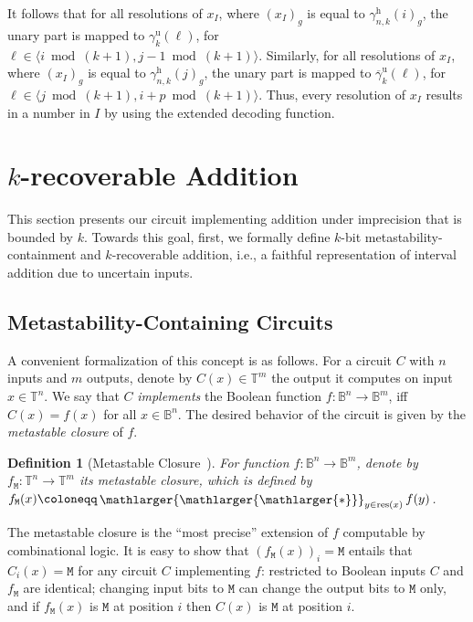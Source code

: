 \documentclass[9pt,journal,compsoc]{IEEEtran}
\newtheorem{definition}[theorem]{Definition}
\theoremstyle{remark}
\DeclareMathOperator{\res}{res}
\newcommand{\bigstarr}{\mathop{\raisebox{-.7pt}{\ensuremath{\mathlarger{\mathlarger{\mathlarger{*}}}}}}}
\newcommand{\mfu}{\mathtt{M}}
\newcommand{\IB}{\mathbb{B}}
\newcommand{\IT}{\mathbb{T}}
\newcommand{\ang}[1]{\langle{#1}\rangle}
\newcommand{\intvl}[1]{\ang{#1}}
\newcommand{\gUnary}[1]{\gamma_{#1}^{\operatorname{u}}}
\newcommand{\gbUnary}[1]{\overline{\gamma}_{#1}^{\operatorname{u}}}
\newcommand{\gHyb}[1]{\gamma_{#1}^{\operatorname{h}}}
\begin{document}
\begin{IEEEproof}
  It follows that for all resolutions of $x_I$, where $(x_I)_g$ is equal to
    $\gHyb{n,k}(i)_g$, the unary part is mapped to
    $\gUnary{k}(\ell)$, for $\ell\in\intvl{i \bmod (k+1), j-1 \bmod (k+1)}$.
  Similarly, for all resolutions of $x_I$, where $(x_I)_g$ is equal to
    $\gHyb{n,k}(j)_g$, the unary part is mapped to
    $\gbUnary{k}(\ell)$, for $\ell\in\intvl{j \bmod (k+1), i+p \bmod (k+1)}$.
  Thus, every resolution of $x_I$ results in a number in $I$ by using the extended
    decoding function.
\end{IEEEproof}

\section{\texorpdfstring{$k$}{k}-recoverable Addition}\label{sec:addition}

This section presents our circuit implementing addition under imprecision
  that is bounded by $k$.
Towards this goal, first, we formally define $k$-bit metastability-containment 
  and $k$-recoverable addition, i.e.,
  a faithful representation of interval addition due to uncertain inputs.

\subsection{Metastability-Containing Circuits}\label{sec:hazfree}

A convenient formalization of this concept is as follows. For a circuit $C$
with $n$ inputs and $m$ outputs, denote by $C(x)\in \IT^m$ the output it
computes on input $x\in \IT^n$. We say that $C$ \emph{implements} the Boolean
function $f\colon \IB^n\to \IB^m$, iff $C(x)=f(x)$ for all $x\in \IB^n$. The
desired behavior of the circuit is given by the \emph{metastable closure} of
$f$.

\begin{definition}[Metastable Closure~\cite{friedrichs18containing}]\label{def:hfree}
For function $f\colon \IB^n\to \IB^m$, denote by $f_{\mfu}\colon \IT^n\to \IT^m$
its \emph{metastable closure}, which is defined by $f_{\mfu}(x)\coloneqq
\bigstarr_{y\in \res(x)}f(y)$.
\end{definition}

The metastable closure is the ``most precise'' extension of $f$ computable by
combinational logic. It is easy to show that
$(f_{\mfu}(x))_i=\mfu$ entails that $C_i(x)=\mfu$ for any circuit $C$
implementing $f$: restricted to Boolean inputs $C$ and $f_{\mfu}$ are
identical; changing input bits to $\mfu$ can change the output bits to $\mfu$ only,
and if $f_{\mfu}(x)$ is $\mfu$ at position $i$ then $C(x)$ is $\mfu$ at position $i$.
\end{document}
